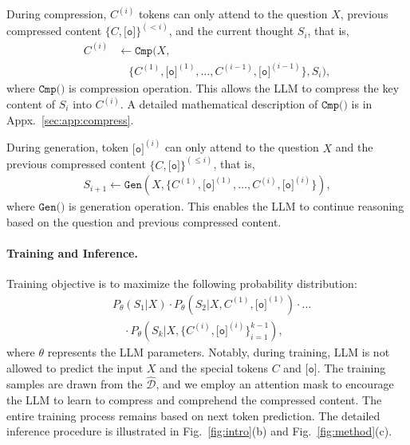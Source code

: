During compression, $C^{(i)}$ tokens can only attend to the question $X$, previous compressed content $\{{C,\texttt{[o]}\}}^{(<i)}$, and the current thought $S_i$, that is, 
\begin{align*}
C^{(i)} &\leftarrow \texttt{Cmp}(X, \\
&\quad \{C^{(1)}, \texttt{[o]}^{(1)}, \dots, C^{(i-1)}, \texttt{[o]}^{(i-1)}\}, S_i),
\end{align*}
where $\texttt{Cmp()}$ is compression operation.
This allows the LLM to compress the key content of $S_i$ into $C^{(i)}$.
A detailed mathematical description of $\texttt{Cmp()}$ is in Appx.~\ref{sec:app:compress}.

During generation, token $\texttt{[o]}^{(i)}$ can only attend to the question $X$ and the previous compressed content $\{C, \texttt{[o]}\}^{(\le i)}$, that is, 
\begin{align*}
S_{i+1}\leftarrow \texttt{Gen}(X,\{C^{(1)}, \texttt{[o]}^{(1)},\dots,C^{(i)},\texttt{[o]}^{(i)}\}),
\end{align*}
where $\texttt{Gen()}$ is generation operation.
This enables the LLM to continue reasoning based on the question and previous compressed content.

\paragraph{Training and Inference.}
Training objective is to maximize the following probability distribution:
\begin{align*}
&P_\theta(S_1|X) \cdot P_\theta (S_2|X,C^{(1)},\texttt{[o]}^{(1)})\cdot \dots \\
&\quad\cdot P_\theta ( S_k|X, \{ C^{(i)},\texttt{[o]}^{(i)} \}_{i=1}^{k-1}  ),
\end{align*}
where $\theta$ represents the LLM parameters.
Notably, during training, LLM is not allowed to predict the input $X$ and the special tokens $C$ and $\texttt{[o]}$.
The training samples are drawn from the $\mathcal{\hat{D}}$, and we employ an attention mask to encourage the LLM to learn to compress and comprehend the compressed content. 
The entire training process remains based on next token prediction. 
The detailed inference procedure is illustrated in Fig.~\ref{fig:intro}(b) and Fig.~\ref{fig:method}(c). 

